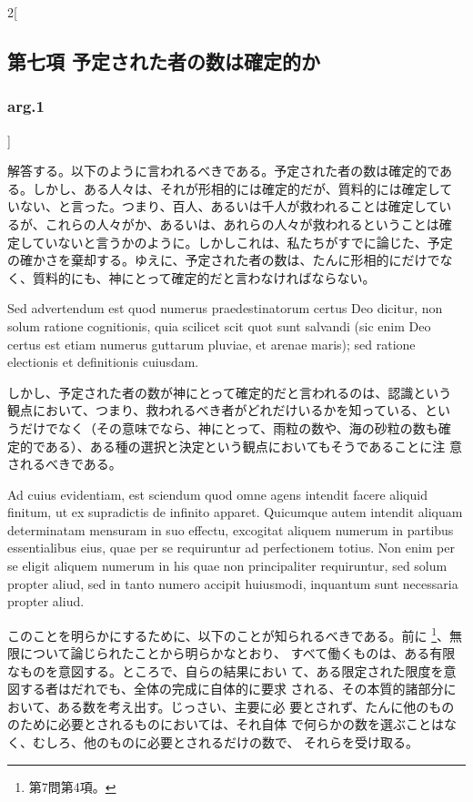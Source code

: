 \documentclass[paper=a4paper,fontsize=10pt,jafontsize=9pt,titlepage]{jlreq}
\begin{document}
\begin{paracol}{2}[\subsection{第七項 予定された者の数は確定的か}\subsubsection{arg.1}]
\switchcolumn


解答する。以下のように言われるべきである。予定された者の数は確定的であ
る。しかし、ある人々は、それが形相的には確定的だが、質料的には確定して
いない、と言った。つまり、百人、あるいは千人が救われることは確定してい
るが、これらの人々がか、あるいは、あれらの人々が救われるということは確
定していないと言うかのように。しかしこれは、私たちがすでに論じた、予定
の確かさを棄却する。ゆえに、予定された者の数は、たんに形相的にだけでな
く、質料的にも、神にとって確定的だと言わなければならない。


\switchcolumn*


Sed advertendum est quod numerus
praedestinatorum certus Deo dicitur, non solum ratione cognitionis, quia
scilicet scit quot sunt salvandi (sic enim Deo certus est etiam numerus
guttarum pluviae, et arenae maris); sed ratione electionis et
definitionis cuiusdam.


\switchcolumn


しかし、予定された者の数が神にとって確定的だと言われるのは、認識という
観点において、つまり、救われるべき者がどれだけいるかを知っている、とい
うだけでなく（その意味でなら、神にとって、雨粒の数や、海の砂粒の数も確
定的である）、ある種の選択と決定という観点においてもそうであることに注
意されるべきである。


\switchcolumn*


Ad cuius evidentiam, est sciendum quod omne agens
intendit facere aliquid finitum, ut ex supradictis de infinito
apparet. Quicumque autem intendit aliquam determinatam mensuram in suo
effectu, excogitat aliquem numerum in partibus essentialibus eius, quae
per se requiruntur ad perfectionem totius. Non enim per se eligit
aliquem numerum in his quae non principaliter requiruntur, sed solum
propter aliud, sed in tanto numero accipit huiusmodi, inquantum sunt
necessaria propter aliud.


\switchcolumn


このことを明らかにするために、以下のことが知られるべきである。前に
\footnote{第7問第4項。}、無限について論じられたことから明らかなとおり、
すべて働くものは、ある有限なものを意図する。ところで、自らの結果におい
て、ある限定された限度を意図する者はだれでも、全体の完成に自体的に要求
される、その本質的諸部分において、ある数を考え出す。じっさい、主要に必
要とされず、たんに他のもののために必要とされるものにおいては、それ自体
で何らかの数を選ぶことはなく、むしろ、他のものに必要とされるだけの数で、
それらを受け取る。


\switchcolumn*



\end{paracol}
\end{document}
